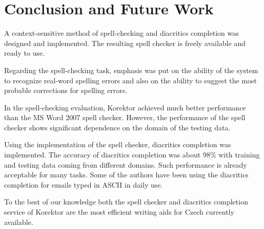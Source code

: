 \documentclass[11pt]{article}
\begin{document}



\section{Conclusion and Future Work}
\label{sec:conclusion}
A context-sensitive method of spell-checking and diacritics completion was designed and implemented. The resulting spell checker is freely available and ready to use.

Regarding the spell-checking task, emphasis was put on the ability of the system to recognize real-word spelling errors and also on the ability to suggest the most probable corrections for spelling errors.

In the spell-checking evaluation, Korektor achieved much better
performance than the MS Word 2007 spell checker. However, the
performance of the spell checker shows significant dependence on the domain of the testing data.

Using the implementation of the spell checker, diacritics completion was implemented. 
The accuracy of diacritics completion was about 98\% with training and testing data coming from different domains.
Such performance is already acceptable for many tasks. Some of the authors have been using the diacritics completion 
for emails typed in ASCII in daily use.

To the best of our knowledge both the spell checker  and diacritics completion service of Korektor are the most efficient writing aids for Czech currently available. 
\end{document}
